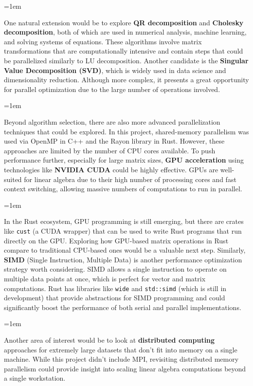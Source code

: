 \documentclass[12pt]{article}
\begin{document}
\parskip=1em

One natural extension would be to explore \textbf{QR decomposition} and \textbf{Cholesky decomposition}, both of which are used in numerical analysis,
machine learning, and solving systems of equations. These algorithms involve matrix transformations that are computationally intensive and contain
steps that could be parallelized similarly to LU decomposition. Another candidate is the \textbf{Singular Value Decomposition (SVD)}, which is widely
used in data science and dimensionality reduction. Although more complex, it presents a great opportunity for parallel optimization due to the large number
of operations involved.

\parskip=1em

Beyond algorithm selection, there are also more advanced parallelization techniques that could be explored. In this project, shared-memory
parallelism was used via OpenMP in C++ and the Rayon library in Rust. However, these approaches are limited by the number of CPU cores available.
To push performance further, especially for large matrix sizes, \textbf{GPU acceleration} using technologies like \textbf{NVIDIA CUDA} could be
highly effective. GPUs are well-suited for linear algebra due to their high number of processing cores and fast context switching, allowing massive
numbers of computations to run in parallel.

\parskip=1em

In the Rust ecosystem, GPU programming is still emerging, but there are crates like \texttt{cust} (a CUDA wrapper) that can be used to write Rust
programs that run directly on the GPU. Exploring how GPU-based matrix operations in Rust compare to traditional CPU-based ones would be a valuable
next step. Similarly, \textbf{SIMD} (Single Instruction, Multiple Data) is another performance optimization strategy worth considering. SIMD allows
a single instruction to operate on multiple data points at once, which is perfect for vector and matrix computations. Rust has libraries like
\texttt{wide} and \texttt{std::simd} (which is still in development) that provide abstractions for SIMD programming and could significantly boost the
performance of both serial and parallel implementations.

\parskip=1em

Another area of interest would be to look at \textbf{distributed computing} approaches for extremely large datasets that don't fit into memory on a
single machine. While this project didn't include MPI, revisiting distributed memory parallelism could provide insight into scaling linear algebra computations beyond a single workstation.
\end{document}
